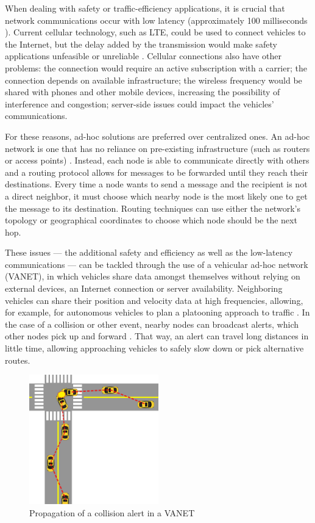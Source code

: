 When dealing with safety or traffic-efficiency applications, it is crucial that network communications occur with low latency (approximately 100 milliseconds \citep{camp2005vehicle}).
Current cellular technology, such as LTE, could be used to connect vehicles to the Internet, but the delay added by the transmission would make safety applications unfeasible or unreliable \citep{mangel2010comparison}.
Cellular connections also have other problems: the connection would require an active subscription with a carrier; the connection depends on available infrastructure; the wireless frequency would be shared with phones and other mobile devices, increasing the possibility of interference and congestion; server-side issues could impact the vehicles' communications.

For these reasons, ad-hoc solutions are preferred over centralized ones.
An ad-hoc network is one that has no reliance on pre-existing infrastructure (such as routers or access points) \citep{wu2004ad}.
Instead, each node is able to communicate directly with others and a routing protocol allows for messages to be forwarded until they reach their destinations.
Every time a node wants to send a message and the recipient is not a direct neighbor, it must choose which nearby node is the most likely one to get the message to its destination.
Routing techniques can use either the network's topology or geographical coordinates \citep{saini2015close} to choose which node should be the next hop.

These issues — the additional safety and efficiency as well as the low-latency communications — can be tackled through the use of a vehicular ad-hoc network (VANET), in which vehicles share data amongst themselves without relying on external devices, an Internet connection or server availability.
Neighboring vehicles can share their position and velocity data at high frequencies, allowing, for example, for autonomous vehicles to plan a platooning approach to traffic \citep{amoozadeh2015platoon}.
In the case of a collision or other event, nearby nodes can broadcast alerts, which other nodes pick up and forward \citep{li2007routing}.
That way, an alert can travel long distances in little time, allowing approaching vehicles to safely slow down or pick alternative routes.

\begin{figure}[h]
    \centering
    \includegraphics[width=0.5\textwidth]{images/collision.png}
    \caption{Propagation of a collision alert in a VANET}
    \label{fig:collision}
\end{figure}


